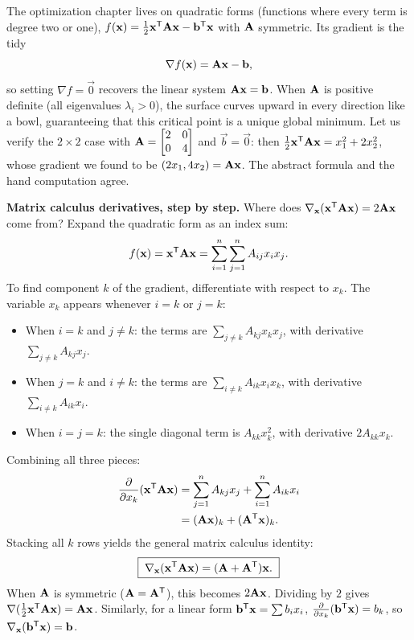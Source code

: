 \begin{example}
\label{ch39:ex-quadform}
The optimization chapter lives on quadratic forms (functions where every term is degree two or one),
$f(\mathbf{x}) = \tfrac12 \mathbf{x}^{\mathsf{T}}\mathbf{A}\mathbf{x} - \mathbf{b}^{\mathsf{T}}\mathbf{x}$ with $\mathbf{A}$ symmetric. Its
gradient is the tidy
\[
\nabla f(\mathbf{x}) = \mathbf{A}\mathbf{x} - \mathbf{b},
\]
so setting $\nabla f = \vec{0}$ recovers the linear system $\mathbf{A}\mathbf{x} = \mathbf{b}$. When $\mathbf{A}$
is positive definite (all eigenvalues $\lambda_i > 0$), the surface curves upward in every direction
like a bowl, guaranteeing that this critical point is a unique global minimum. Let us verify the
$2\times2$ case with $\mathbf{A} = \begin{bmatrix}2 & 0\\ 0 & 4\end{bmatrix}$ and $\vec{b} = \vec{0}$:
then $\tfrac12\mathbf{x}^{\mathsf{T}}\mathbf{A}\mathbf{x} = x_1^2 + 2x_2^2$, whose gradient we found to be
$(2x_1, 4x_2) = \mathbf{A}\mathbf{x}$. The abstract formula and the hand computation agree.
\end{example}

\begin{formalbox}
\textbf{Matrix calculus derivatives, step by step.} Where does $\nabla_{\mathbf{x}}(\mathbf{x}^{\mathsf{T}}\mathbf{A}\mathbf{x}) = 2\mathbf{A}\mathbf{x}$ come from? Expand the quadratic form as an index sum:
\[
  f(\mathbf{x}) = \mathbf{x}^{\mathsf{T}}\mathbf{A}\mathbf{x} = \sum_{i=1}^n \sum_{j=1}^n A_{ij} x_i x_j.
\]
To find component $k$ of the gradient, differentiate with respect to $x_k$. The variable $x_k$ appears whenever $i=k$ or $j=k$:
\begin{itemize}
  \item When $i=k$ and $j \ne k$: the terms are $\sum_{j \ne k} A_{kj} x_k x_j$, with derivative $\sum_{j \ne k} A_{kj} x_j$.
  \item When $j=k$ and $i \ne k$: the terms are $\sum_{i \ne k} A_{ik} x_i x_k$, with derivative $\sum_{i \ne k} A_{ik} x_i$.
  \item When $i=j=k$: the single diagonal term is $A_{kk} x_k^2$, with derivative $2 A_{kk} x_k$.
\end{itemize}
Combining all three pieces:
\begin{align*}
  \frac{\partial}{\partial x_k}(\mathbf{x}^{\mathsf{T}}\mathbf{A}\mathbf{x})
  &= \sum_{j=1}^n A_{kj} x_j + \sum_{i=1}^n A_{ik} x_i \\
  &= (\mathbf{A}\mathbf{x})_k + (\mathbf{A}^{\mathsf{T}}\mathbf{x})_k.
\end{align*}
Stacking all $k$ rows yields the general matrix calculus identity:
\[
  \boxed{\;\nabla_{\mathbf{x}}(\mathbf{x}^{\mathsf{T}}\mathbf{A}\mathbf{x}) = (\mathbf{A} + \mathbf{A}^{\mathsf{T}})\mathbf{x}.\;}
\]
When $\mathbf{A}$ is symmetric ($\mathbf{A} = \mathbf{A}^{\mathsf{T}}$), this becomes $2\mathbf{A}\mathbf{x}$. Dividing by $2$ gives $\nabla(\tfrac12\mathbf{x}^{\mathsf{T}}\mathbf{A}\mathbf{x}) = \mathbf{A}\mathbf{x}$. Similarly, for a linear form $\mathbf{b}^{\mathsf{T}}\mathbf{x} = \sum b_i x_i$, $\frac{\partial}{\partial x_k}(\mathbf{b}^{\mathsf{T}}\mathbf{x}) = b_k$, so $\nabla_{\mathbf{x}}(\mathbf{b}^{\mathsf{T}}\mathbf{x}) = \mathbf{b}$.
\end{formalbox}

